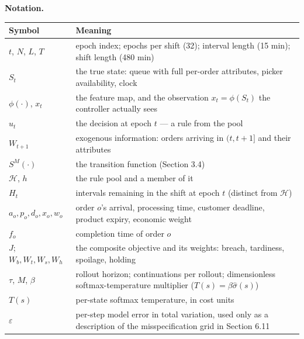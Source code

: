 \documentclass[review,3p,times]{elsarticle}
\newcounter{none}
\theoremstyle{definition}
\begin{document}
\textbf{Notation.}

{\def\LTcaptype{none} %
\begin{longtable}[]{@{}
  >{\raggedright\arraybackslash}p{}
  >{\raggedright\arraybackslash}p{}@{}}
\toprule\noalign{}
\begin{minipage}[b]{\linewidth}\raggedright
Symbol
\end{minipage} & \begin{minipage}[b]{\linewidth}\raggedright
Meaning
\end{minipage} \\
\midrule\noalign{}
\endhead
\bottomrule\noalign{}
\endlastfoot
\(t\), \(N\), \(L\), \(T\) & epoch index; epochs per shift (32);
interval length (15 min); shift length (480 min) \\
\(S_t\) & the true state: queue with full per-order attributes, picker
availability, clock \\
\(\phi(\cdot)\), \(x_t\) & the feature map, and the observation
\(x_t = \phi(S_t)\) the controller actually sees \\
\(u_t\) & the decision at epoch \(t\) --- a rule from the pool \\
\(W_{t+1}\) & exogenous information: orders arriving in \((t, t+1]\) and
their attributes \\
\(S^M(\cdot)\) & the transition function (Section 3.4) \\
\(\mathcal{H}\), \(h\) & the rule pool and a member of it \\
\(H_t\) & intervals remaining in the shift at epoch \(t\) (distinct from
\(\mathcal{H}\)) \\
\(a_o, p_o, d_o, x_o, w_o\) & order \(o\)'s arrival, processing time,
customer deadline, product expiry, economic weight \\
\(f_o\) & completion time of order \(o\) \\
\(J\); \(W_b, W_t, W_s, W_h\) & the composite objective and its weights:
breach, tardiness, spoilage, holding \\
\(\tau\), \(M\), \(\beta\) & rollout horizon; continuations per rollout;
dimensionless softmax-temperature multiplier
(\(T(s)=\beta\hat\sigma(s)\)) \\
\(T(s)\) & per-state softmax temperature, in cost units \\
\(\varepsilon\) & per-step model error in total variation, used only as
a description of the misspecification grid in Section 6.11 \\
\end{longtable}
}
\end{document}
